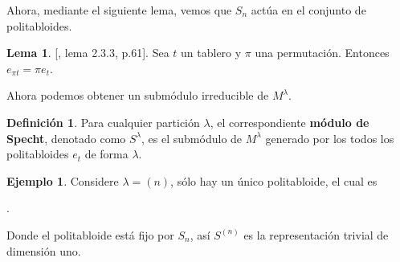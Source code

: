 \documentclass[12pt]{book}
\theoremstyle{definition}
\newtheorem{definition}[theorem]{Definición}
\newtheorem{example}[theorem]{Ejemplo}
\newtheorem{lemma}[theorem]{Lema}
\newcounter{in}
\newcounter{ini}
\begin{document}
Ahora, mediante el siguiente lema, vemos que $S_{n}$ actúa en el
conjunto de politabloides.
\begin{lemma}{[\cite{sagan2001symmetric}, lema 2.3.3, p.61]}.
  \label{lema}
  Sea $t$ un tablero y $\pi$ una permutación. Entonces $e_{\pi t}=\pi e_{t}$.
\end{lemma}
Ahora podemos obtener un submódulo irreducible de
$M^{\lambda}$.
\begin{definition}
  Para cualquier partición $\lambda$, el correspondiente
  \textbf{módulo de Specht}, denotado como $S^{\lambda}$, es el submódulo
  de $M^{\lambda}$ generado por los todos los politabloides $e_{t}$ de
  forma $\lambda$.
\end{definition}
\begin{example}
  \label{n}
  Considere $\lambda=(n)$, sólo hay un único politabloide, el cual es
  \begin{center}
     \quad .
  \end{center}
Donde el politabloide está fijo por $S_{n}$, así $S^{(n)}$ es la
representación trivial de dimensión uno. 
\end{example}
\end{document}
